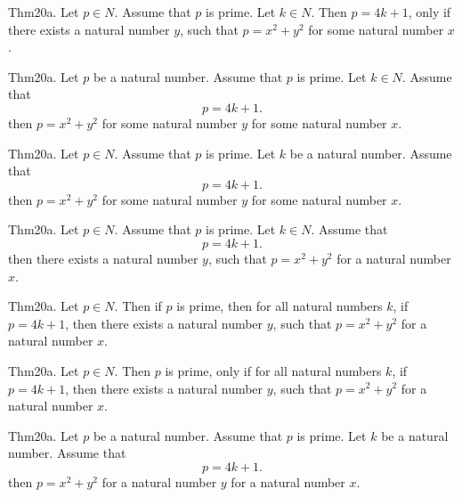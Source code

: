 \documentclass{article}
\begin{document}
Thm20a. Let $p \in N$. Assume that $p$ is prime. Let $k \in N$. Then $p = 4 k + 1$, only if there exists a natural number $y$, such that $p = x ^{ 2}+ y ^{ 2}$ for some natural number $x$.

Thm20a. Let $p$ be a natural number. Assume that $p$ is prime. Let $k \in N$. Assume that $$p = 4 k + 1.$$ then $p = x ^{ 2}+ y ^{ 2}$ for some natural number $y$ for some natural number $x$.

Thm20a. Let $p \in N$. Assume that $p$ is prime. Let $k$ be a natural number. Assume that $$p = 4 k + 1.$$ then $p = x ^{ 2}+ y ^{ 2}$ for some natural number $y$ for some natural number $x$.

Thm20a. Let $p \in N$. Assume that $p$ is prime. Let $k \in N$. Assume that $$p = 4 k + 1.$$ then there exists a natural number $y$, such that $p = x ^{ 2}+ y ^{ 2}$ for a natural number $x$.

Thm20a. Let $p \in N$. Then if $p$ is prime, then for all natural numbers $k$, if $p = 4 k + 1$, then there exists a natural number $y$, such that $p = x ^{ 2}+ y ^{ 2}$ for a natural number $x$.

Thm20a. Let $p \in N$. Then $p$ is prime, only if for all natural numbers $k$, if $p = 4 k + 1$, then there exists a natural number $y$, such that $p = x ^{ 2}+ y ^{ 2}$ for a natural number $x$.

Thm20a. Let $p$ be a natural number. Assume that $p$ is prime. Let $k$ be a natural number. Assume that $$p = 4 k + 1.$$ then $p = x ^{ 2}+ y ^{ 2}$ for a natural number $y$ for a natural number $x$.
\end{document}
